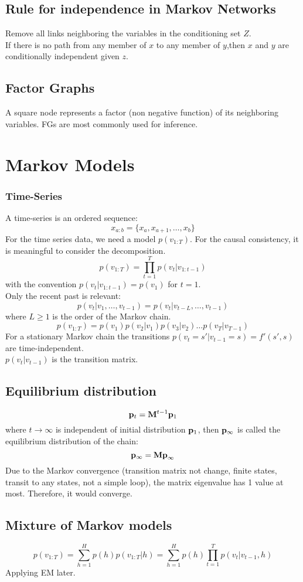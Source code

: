\documentclass[12pt,a4paper]{article}
\begin{document}
\subsection*{Rule for independence in Markov Networks}
Remove all links neighboring the variables in the conditioning set $Z$.\\
If there is no path from any member of $x$ to any member of $y$,then $x$ and $y$ are conditionally independent given $z$.
\subsection*{Factor Graphs}
A square node represents a factor (non negative function) of its neighboring variables. FGs are most commonly used for inference.
\section*{Markov Models}
\subsubsection*{Time-Series}
A time-series is an ordered sequence:
$$
x_{a:b}=\{x_a,x_{a+1},\ldots,x_b\}
$$
For the time series data, we need a model $p(v_{1:T})$. For the causal consistency, it is meaningful to consider the decomposition.
$$
p(v_{1:T}) = \prod_{t=1}^{T}p(v_t|v_{1:t-1})
$$
with the convention $p(v_t|v_{1:t-1}) = p(v_1)$ for $t=1$.\\
Only the recent past is relevant:
$$
p(v_t|v_1,\ldots,v_{t-1}) = p(v_t|v_{t-L},\ldots,v_{t-1})
$$
where $L\ge 1$ is the order of the Markov chain.
$$
p(v_{1:T}) = p(v_1)p(v_2|v_1)p(v_3|v_2)\ldots p(v_T|v_{T-1})
$$
For a stationary Markov chain the transitions $p(v_t=s'|v_{t-1}=s)=f'(s',s)$ are time-independent.\\
$p(v_t|v_{t-1})$ is the transition matrix.\\
\subsection*{Equilibrium distribution}
$$
{\bf p}_t = {\bf M}^{t-1}{\bf p}_1
$$
where $t\rightarrow \infty$ is independent of initial distribution ${\bf p}_1$, then ${\bf p}_{\infty}$ is called the equilibrium distribution of the chain:
$$
{\bf p}_\infty = {\bf Mp}_\infty
$$
Due to the Markov convergence (transition matrix not change, finite states, transit to any states, not a simple loop), the matrix eigenvalue has 1 value at most. Therefore, it would converge.
\subsection*{Mixture of Markov models}
$$
p(v_{1:T}) =\sum_{h=1}^{H}p(h)p(v_{1:T}|h)=\sum_{h=1}^{H}p(h)\prod_{t=1}^{T}p(v_t|v_{t-1},h)
$$
Applying EM later.
\end{document}
